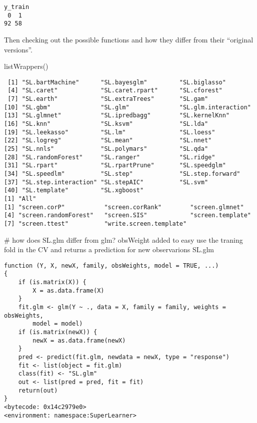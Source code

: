 \documentclass[
  letterpaper,
  DIV=11,
  numbers=noendperiod]{scrartcl}
\newenvironment{Shaded}{\begin{snugshade}}{\end{snugshade}}
\newcommand{\CommentTok}[1]{\textcolor[rgb]{0.37,0.37,0.37}{#1}}
\newcommand{\FunctionTok}[1]{\textcolor[rgb]{0.28,0.35,0.67}{#1}}
\newcommand{\NormalTok}[1]{\textcolor[rgb]{0.00,0.23,0.31}{#1}}
\begin{document}
\begin{verbatim}
y_train
 0  1 
92 58 
\end{verbatim}

Then checking out the possible functions and how they differ from their
``original versions''.

\begin{Shaded}
\begin{Highlighting}[]
\FunctionTok{listWrappers}\NormalTok{()}
\end{Highlighting}
\end{Shaded}

\begin{verbatim}
 [1] "SL.bartMachine"      "SL.bayesglm"         "SL.biglasso"        
 [4] "SL.caret"            "SL.caret.rpart"      "SL.cforest"         
 [7] "SL.earth"            "SL.extraTrees"       "SL.gam"             
[10] "SL.gbm"              "SL.glm"              "SL.glm.interaction" 
[13] "SL.glmnet"           "SL.ipredbagg"        "SL.kernelKnn"       
[16] "SL.knn"              "SL.ksvm"             "SL.lda"             
[19] "SL.leekasso"         "SL.lm"               "SL.loess"           
[22] "SL.logreg"           "SL.mean"             "SL.nnet"            
[25] "SL.nnls"             "SL.polymars"         "SL.qda"             
[28] "SL.randomForest"     "SL.ranger"           "SL.ridge"           
[31] "SL.rpart"            "SL.rpartPrune"       "SL.speedglm"        
[34] "SL.speedlm"          "SL.step"             "SL.step.forward"    
[37] "SL.step.interaction" "SL.stepAIC"          "SL.svm"             
[40] "SL.template"         "SL.xgboost"         
[1] "All"
[1] "screen.corP"           "screen.corRank"        "screen.glmnet"        
[4] "screen.randomForest"   "screen.SIS"            "screen.template"      
[7] "screen.ttest"          "write.screen.template"
\end{verbatim}

\begin{Shaded}
\begin{Highlighting}[]
\CommentTok{\# how does SL.glm differ from glm? obsWeight added to easy use the traning fold in the CV and returns a prediction for new observarions}
\NormalTok{SL.glm}
\end{Highlighting}
\end{Shaded}

\begin{verbatim}
function (Y, X, newX, family, obsWeights, model = TRUE, ...) 
{
    if (is.matrix(X)) {
        X = as.data.frame(X)
    }
    fit.glm <- glm(Y ~ ., data = X, family = family, weights = obsWeights, 
        model = model)
    if (is.matrix(newX)) {
        newX = as.data.frame(newX)
    }
    pred <- predict(fit.glm, newdata = newX, type = "response")
    fit <- list(object = fit.glm)
    class(fit) <- "SL.glm"
    out <- list(pred = pred, fit = fit)
    return(out)
}
<bytecode: 0x14c2979e0>
<environment: namespace:SuperLearner>
\end{verbatim}
\end{document}
